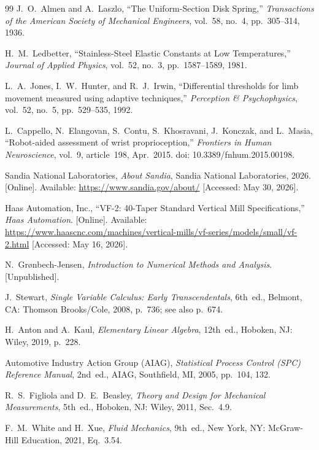 \documentclass[12pt, letterpaper]{report}%
\begin{document}
\begin{thebibliography}{99}
	J.\ O.\ Almen and A.\ Laszlo,
	``The Uniform-Section Disk Spring,''
	\textit{Transactions of the American Society of Mechanical Engineers},
	vol.~58, no.~4, pp.~305--314, 1936.

	H.\ M.\ Ledbetter,
	``Stainless-Steel Elastic Constants at Low Temperatures,''
	\textit{Journal of Applied Physics}, vol.~52, no.~3, pp.~1587--1589, 1981.

	L.\ A.\ Jones, I.\ W.\ Hunter, and R.\ J.\ Irwin,
	``Differential thresholds for limb movement measured using adaptive techniques,''
	\textit{Perception \& Psychophysics}, vol.~52, no.~5, pp.~529--535, 1992.

	L.\ Cappello, N.\ Elangovan, S.\ Contu, S.\ Khosravani, J.\ Konczak,
	and L.\ Masia,
	``Robot-aided assessment of wrist proprioception,''
	\textit{Frontiers in Human Neuroscience}, vol.~9, article~198, Apr.\ 2015.
	doi: 10.3389/fnhum.2015.00198.

	Sandia National Laboratories, \textit{About Sandia},
	Sandia National Laboratories, 2026. [Online].
	Available: \url{https://www.sandia.gov/about/}
	[Accessed: May 30, 2026].

	Haas Automation, Inc.,
	``VF-2: 40-Taper Standard Vertical Mill Specifications,''
	\textit{Haas Automation}. [Online].
	Available: \url{https://www.haascnc.com/machines/vertical-mills/vf-series/models/small/vf-2.html}
	[Accessed: May 16, 2026].

	N.\ Grønbech-Jensen,
	\textit{Introduction to Numerical Methods and Analysis}.
	[Unpublished].

	J.\ Stewart, \textit{Single Variable Calculus: Early Transcendentals},
	6th~ed., Belmont, CA: Thomson Brooks/Cole, 2008, p.~736; see also p.~674.

	H.\ Anton and A.\ Kaul, \textit{Elementary Linear Algebra},
	12th~ed., Hoboken, NJ: Wiley, 2019, p.~228.

	Automotive Industry Action Group (AIAG),
	\textit{Statistical Process Control (SPC) Reference Manual},
	2nd~ed., AIAG, Southfield, MI, 2005, pp.~104, 132.

	R.\ S.\ Figliola and D.\ E.\ Beasley,
	\textit{Theory and Design for Mechanical Measurements},
	5th~ed., Hoboken, NJ: Wiley, 2011, Sec.~4.9.

	F.\ M.\ White and H.\ Xue,
	\textit{Fluid Mechanics}, 9th~ed.,
	New York, NY: McGraw-Hill Education, 2021, Eq.~3.54.


\end{thebibliography}
\end{document}
